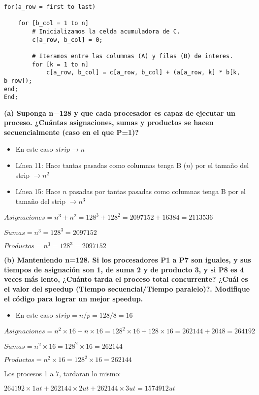 \documentclass[a4paper, 10pt]{article}
\newenvironment{QandA}{
    \begin{enumerate}\bfseries}
    {\end{enumerate}
}
\begin{document}
\begin{QandA}
\begin{lstlisting}
for(a_row = first to last)

    for [b_col = 1 to n]
        # Inicializamos la celda acumuladora de C.
        c[a_row, b_col] = 0;

        # Iteramos entre las columnas (A) y filas (B) de interes.
        for [k = 1 to n]
            c[a_row, b_col] = c[a_row, b_col] + (a[a_row, k] * b[k, b_row]);
end;
End;
\end{lstlisting}

\textbf{(a) Suponga n=128 y que cada procesador es capaz de ejecutar un proceso. ¿Cuántas asignaciones, sumas y productos se hacen secuencialmente (caso en el que P=1)?}

\begin{itemize}
    \item En este caso $strip \rightarrow n$
    \item Línea 11: Hace tantas pasadas como columnas tenga B ($n$) por el tamaño del strip $\rightarrow n^2$
    \item Línea 15: Hace $n$ pasadas por tantas pasadas como columnas tenga B por el tamaño del strip $\rightarrow n^3$
\end{itemize}

$Asignaciones = n^3 + n^2 = 128^3 + 128^2 = 2097152 + 16384 = 2113536$

$Sumas = n^3 = 128^3 = 2097152$

$Productos = n^3 = 128^3 = 2097152$


\textbf{(b) Manteniendo n=128. Si los procesadores P1 a P7 son iguales, y sus tiempos de asignación son 1, de suma 2 y de producto 3, y si
P8 es 4 veces más lento, ¿Cuánto tarda el proceso total concurrente? ¿Cuál es el valor del speedup (Tiempo
secuencial/Tiempo paralelo)?. Modifique el código para lograr un mejor speedup.}

\begin{itemize}
    \item En este caso $strip = n/p = 128/8 = 16$
\end{itemize}

$Asignaciones = n^2 \times 16 + n \times 16 = 128^2 \times 16 + 128 \times 16 = 262144 + 2048 = 264192$

$Sumas = n^2 \times 16 = 128^2 \times 16 = 262144$

$Productos = n^2 \times 16 = 128^2 \times 16 = 262144$

Los procesos 1 a 7, tardaran lo mismo:

$264192 \times 1 ut + 262144 \times 2 ut + 262144 \times 3 ut = 1574912 ut$


\end{QandA}
\end{document}
